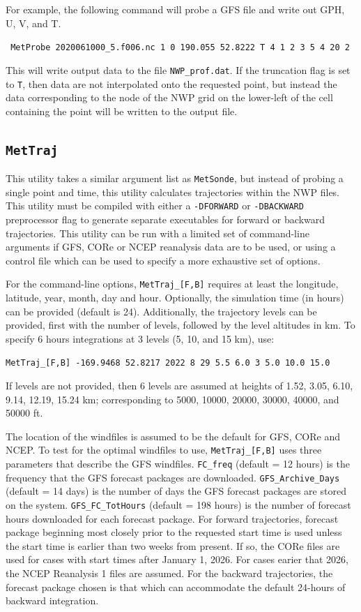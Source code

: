 \documentclass[11pt]{article}   %
\begin{document}
For example, the following command will probe a GFS file and write out
GPH, U, V, and T.

\verb| MetProbe 2020061000_5.f006.nc 1 0 190.055 52.8222 T 4 1 2 3 5 4 20 2 |

This will write output data to the file \texttt{NWP\_prof.dat}.
If the truncation flag is set to \texttt{T}, then data are not interpolated onto
the requested point, but instead the data corresponding to the node of the NWP
grid on the lower-left of the cell containing the point will be written to the output file.

\subsection{\texttt{MetTraj}}

This utility takes a similar argument list as \texttt{MetSonde}, but instead of
probing a single point and time, this utility calculates trajectories within
the NWP files.
This utility must be compiled with either a \texttt{-DFORWARD} or \texttt{-DBACKWARD}
preprocessor flag to generate separate executables for forward or backward trajectories.
This utility can be run with a limited set of command-line arguments if GFS, CORe or NCEP
reanalysis data are to be used, or using a control file which can be used to specify
a more exhaustive set of options.

For the command-line options, \texttt{MetTraj\_[F,B]} requires at least the longitude,
latitude, year, month, day and hour.  Optionally, the simulation time (in hours) can
be provided (default is 24).  Additionally, the trajectory levels can be provided,
first with the number of
levels, followed by the level altitudes in km.  To specify 6 hours
integrations at 3 levels (5, 10, and 15 km), use:

\verb|MetTraj_[F,B] -169.9468 52.8217 2022 8 29 5.5 6.0 3 5.0 10.0 15.0 |

If levels are not provided, then 6 levels are assumed at heights of 1.52,
3.05, 6.10, 9.14, 12.19, 15.24 km; corresponding to 5000, 10000, 20000, 30000,
40000, and 50000 ft.

The location of the windfiles is assumed to be the default for GFS, CORe and NCEP.
To test for the optimal windfiles to use, \texttt{MetTraj\_[F,B]} uses three
parameters that describe the GFS windfiles.
\texttt{FC\_freq} (default = 12 hours) is the frequency that the GFS forecast
packages are downloaded.  
\texttt{GFS\_Archive\_Days} (default = 14 days) is the number of days the GFS
forecast packages are stored on the system.
\texttt{GFS\_FC\_TotHours} (default = 198 hours) is the number of forecast hours
downloaded for each forecast package.
For forward trajectories, forecast package beginning most closely prior to the requested
start time is used unless the start time is earlier than two weeks from present.  If
so, the CORe files are used for cases with start times after January 1, 2026.
For cases earier that 2026, the NCEP Reanalysis 1 files are assumed.
For the backward trajectories, the forecast package
chosen is that which can accommodate the default 24-hours of backward integration.
\end{document}
